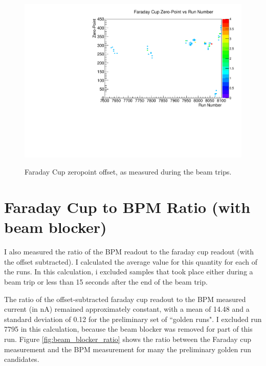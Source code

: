 \documentclass[11pt]{article}
\begin{document}
\begin{figure}[htbp] 
\begin{center}
\includegraphics[width =  .9\textwidth]{figures/zeropoint.pdf}
\label{fig:zero_point}
\caption{Faraday Cup zeropoint offset, as measured during the beam trips.} 

\end{center}
\end{figure}



\section{Faraday Cup to BPM Ratio (with beam blocker)}

I also measured the ratio of the BPM readout to the faraday cup readout (with the offset subtracted).  I calculated the average value for this quantity for each of the runs.  In this calculation, i excluded samples that took place either during a beam trip or less than 15 seconds after the end of the beam trip.  

The ratio of the offset-subtracted faraday cup readout to the BPM measured current (in nA) remained approximately constant, with a mean of 14.48 and a standard deviation of 0.12 for the preliminary set of ``golden runs".  I excluded run 7795 in this calculation, because the beam blocker was removed for part of this run.
Figure \ref{fig:beam_blocker_ratio} shows the ratio between the Faraday cup measurement and the BPM measurement for many the preliminary golden run candidates.
\end{document}
